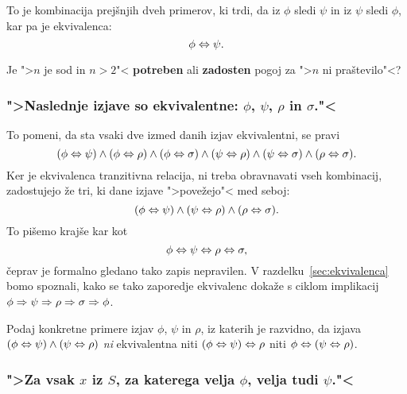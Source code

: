 To je kombinacija prejšnjih dveh primerov, ki trdi, da iz $\phi$ sledi
$\psi$ in iz $\psi$ sledi $\phi$, kar pa je ekvivalenca:
%
\begin{equation*}
  \phi \Leftrightarrow \psi.
\end{equation*}

\begin{naloga}
  Je ">$n$ je sod in $n > 2$"< \textbf{potreben} ali \textbf{zadosten}
  pogoj za ">$n$ ni praštevilo"<?
\end{naloga}


\subsubsection{">Naslednje izjave so ekvivalentne: $\phi$, $\psi$, $\rho$ in $\sigma$."<}

To pomeni, da sta vsaki dve izmed danih izjav ekvivalentni, se pravi
%
\begin{equation*}
  (\phi \Leftrightarrow \psi) \land (\phi \Leftrightarrow \rho) \land (\phi \Leftrightarrow \sigma) \land (\psi \Leftrightarrow \rho)
  \land (\psi \Leftrightarrow \sigma) \land (\rho \Leftrightarrow \sigma).
\end{equation*}
%
Ker je ekvivalenca tranzitivna relacija, ni treba obravnavati vseh
kombinacij, zadostujejo že tri, ki dane izjave ">povežejo"< med seboj:
%
\begin{equation*}
  (\phi \Leftrightarrow \psi) \land (\psi \Leftrightarrow \rho) \land (\rho \Leftrightarrow \sigma).
\end{equation*}
%
To pišemo krajše kar kot
%
\begin{equation*}
  \phi \Leftrightarrow \psi \Leftrightarrow \rho \Leftrightarrow \sigma,
\end{equation*}
%
čeprav je formalno gledano tako zapis nepravilen. V
razdelku~\ref{sec:ekvivalenca} bomo spoznali, kako se tako zaporedje
ekvivalenc dokaže s ciklom implikacij $\phi \Rightarrow \psi \Rightarrow \rho
\Rightarrow \sigma \Rightarrow \phi$.

\begin{naloga}
  Podaj konkretne primere izjav $\phi$, $\psi$ in $\rho$, iz katerih
  je razvidno, da izjava $(\phi \Leftrightarrow \psi) \land (\psi \Leftrightarrow \rho)$
  \emph{ni} ekvivalentna niti $(\phi \Leftrightarrow \psi) \Leftrightarrow \rho$ niti
  $\phi \Leftrightarrow (\psi \Leftrightarrow \rho)$.
\end{naloga}



\subsubsection{">Za vsak $x$ iz $S$, za katerega velja $\phi$, velja tudi
  $\psi$."<}

